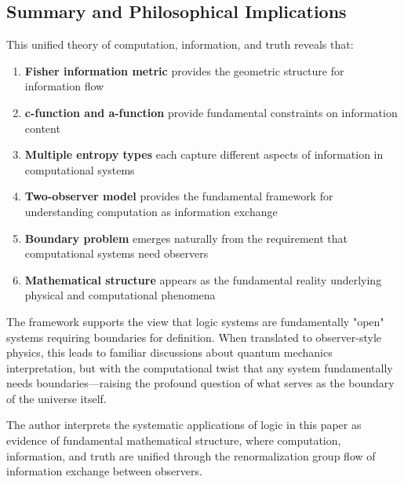 \subsection{Summary and Philosophical Implications}

This unified theory of computation, information, and truth reveals that:

\begin{enumerate}
\item \textbf{Fisher information metric} provides the geometric structure for information flow
\item \textbf{c-function and a-function} provide fundamental constraints on information content
\item \textbf{Multiple entropy types} each capture different aspects of information in computational systems
\item \textbf{Two-observer model} provides the fundamental framework for understanding computation as information exchange
\item \textbf{Boundary problem} emerges naturally from the requirement that computational systems need observers
\item \textbf{Mathematical structure} appears as the fundamental reality underlying physical and computational phenomena
\end{enumerate}

The framework supports the view that logic systems are fundamentally "open" systems requiring boundaries for definition. When translated to observer-style physics, this leads to familiar discussions about quantum mechanics interpretation, but with the computational twist that any system fundamentally needs boundaries—raising the profound question of what serves as the boundary of the universe itself.

The author interprets the systematic applications of logic in this paper as evidence of fundamental mathematical structure, where computation, information, and truth are unified through the renormalization group flow of information exchange between observers.
